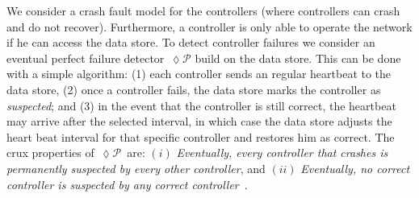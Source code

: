 
We consider a crash fault model for the controllers (where controllers can crash and do not recover). Furthermore, a controller is only able to operate the network if he can access the data store. 
To detect controller failures we consider an eventual perfect failure detector~$\lozenge\mathscr{P}$ build on the data store. 
This can be done with a simple algorithm: (1) each controller sends an regular heartbeat to the data store, (2) once a controller fails, the data store marks the controller as \emph{suspected}; and (3) in the event that the controller is still correct, the heartbeat may arrive after the selected interval, in which case the data store adjusts the heart beat interval for that specific controller and restores him as correct. 
The  crux properties  of~$\lozenge\mathscr{P}$~are: $(i)$  \emph{Eventually, every controller that crashes is permanently suspected by every other controller}, and $(ii)$ \emph{Eventually, no correct controller is suspected by any correct controller}~\cite{2011itra.book.....C}.  


